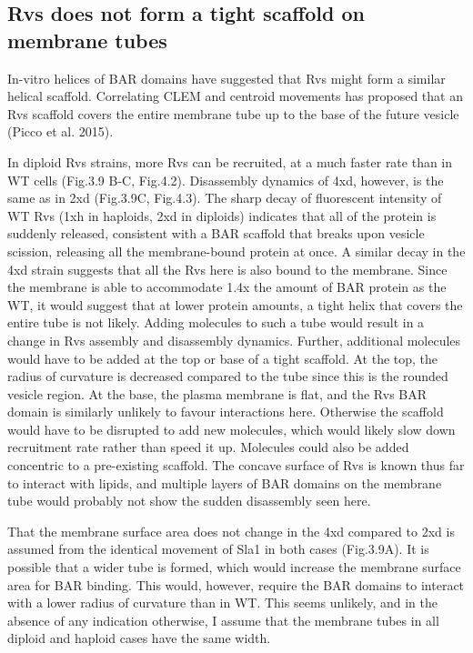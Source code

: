 \subsection{Rvs does not form a tight scaffold on membrane tubes}
In-vitro helices of BAR domains have suggested that Rvs might form a similar helical scaffold. Correlating CLEM and centroid movements has proposed that an Rvs scaffold covers the entire membrane tube up to the base of the future vesicle (Picco et al. 2015). 

	\vspace{5mm}
In diploid Rvs strains, more Rvs can be recruited, at a much faster rate than in WT cells (Fig.3.9 B-C, Fig.4.2). Disassembly dynamics of 4xd, however, is the same as in 2xd (Fig.3.9C, Fig.4.3). The sharp decay of fluorescent intensity of WT Rvs (1xh in haploids, 2xd in diploids) indicates that all of the protein is suddenly released, consistent with a BAR scaffold that breaks upon vesicle scission, releasing all the membrane-bound protein at once. A similar decay in the 4xd strain suggests that all the Rvs here is also bound to the membrane. Since the membrane is able to accommodate 1.4x the amount of BAR protein as the WT, it would suggest that at lower protein amounts, a tight helix that covers the entire tube is not likely. Adding molecules to such a tube would result in a change in Rvs assembly and disassembly dynamics. Further, additional molecules would have to be added at the top or base of a tight scaffold. At the top, the radius of curvature is decreased compared to the tube since this is the rounded vesicle region. At the base, the plasma membrane is flat, and the Rvs BAR domain is similarly unlikely to favour interactions here. Otherwise the scaffold would have to be disrupted to add new molecules, which would likely slow down recruitment rate rather than speed it up. Molecules could also be added concentric to a pre-existing scaffold. The concave surface of Rvs is known thus far to interact with lipids, and multiple layers of BAR domains on the membrane tube would probably not show the sudden disassembly seen here.  

	\vspace{5mm}
That the membrane surface area does not change in the 4xd compared to 2xd is assumed from the identical movement of Sla1 in both cases (Fig.3.9A). It is possible that a wider tube is formed, which would increase the membrane surface area for BAR binding. This would, however, require the BAR domains to interact with a lower radius of curvature than in WT. This seems unlikely, and in the absence of any indication otherwise, I assume that the membrane tubes in all diploid and haploid cases have the same width.

